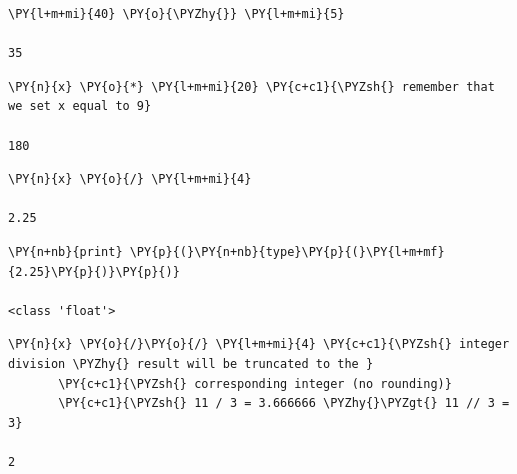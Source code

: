 \begin{tcolorbox}[breakable, size=fbox, boxrule=1pt, pad at break*=1mm, colback=cellbackground, colframe=cellborder]            
\begin{Verbatim}[commandchars=\\\{\}]
\PY{l+m+mi}{40} \PY{o}{\PYZhy{}} \PY{l+m+mi}{5}

35
\end{Verbatim}
\end{tcolorbox}

\begin{tcolorbox}[breakable, size=fbox, boxrule=1pt, pad at break*=1mm, colback=cellbackground, colframe=cellborder]            
\begin{Verbatim}[commandchars=\\\{\}]
\PY{n}{x} \PY{o}{*} \PY{l+m+mi}{20} \PY{c+c1}{\PYZsh{} remember that we set x equal to 9}

180
\end{Verbatim}
\end{tcolorbox}

\begin{tcolorbox}[breakable, size=fbox, boxrule=1pt, pad at break*=1mm, colback=cellbackground, colframe=cellborder]            
\begin{Verbatim}[commandchars=\\\{\}]
\PY{n}{x} \PY{o}{/} \PY{l+m+mi}{4}

2.25
\end{Verbatim}
\end{tcolorbox}

\begin{tcolorbox}[breakable, size=fbox, boxrule=1pt, pad at break*=1mm, colback=cellbackground, colframe=cellborder]            
\begin{Verbatim}[commandchars=\\\{\}]
\PY{n+nb}{print} \PY{p}{(}\PY{n+nb}{type}\PY{p}{(}\PY{l+m+mf}{2.25}\PY{p}{)}\PY{p}{)}

<class 'float'>
\end{Verbatim}
\end{tcolorbox}

\begin{tcolorbox}[breakable, size=fbox, boxrule=1pt, pad at break*=1mm, colback=cellbackground, colframe=cellborder]            
\begin{Verbatim}[commandchars=\\\{\}]
\PY{n}{x} \PY{o}{/}\PY{o}{/} \PY{l+m+mi}{4} \PY{c+c1}{\PYZsh{} integer division \PYZhy{} result will be truncated to the }
       \PY{c+c1}{\PYZsh{} corresponding integer (no rounding)}
       \PY{c+c1}{\PYZsh{} 11 / 3 = 3.666666 \PYZhy{}\PYZgt{} 11 // 3 = 3}

2
\end{Verbatim}
\end{tcolorbox}

